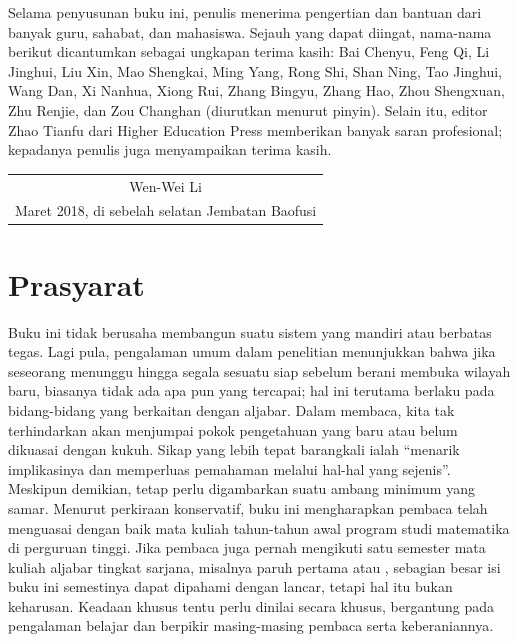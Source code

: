 Selama penyusunan buku ini, penulis menerima pengertian dan bantuan dari banyak guru, sahabat, dan mahasiswa. Sejauh yang dapat diingat, nama-nama berikut dicantumkan sebagai ungkapan terima kasih: Bai Chenyu, Feng Qi, Li Jinghui, Liu Xin, Mao Shengkai, Ming Yang, Rong Shi, Shan Ning, Tao Jinghui, Wang Dan, Xi Nanhua, Xiong Rui, Zhang Bingyu, Zhang Hao, Zhou Shengxuan, Zhu Renjie, dan Zou Changhan {\small(diurutkan menurut pinyin)}. Selain itu, editor Zhao Tianfu dari Higher Education Press memberikan banyak saran profesional; kepadanya penulis juga menyampaikan terima kasih.\nopagebreak

\vspace{1em}
\begin{flushright}\begin{minipage}{0.58\textwidth}
	\begin{tabular}{c}
		{\kaishu Wen-Wei Li} \\
		Maret 2018, di sebelah selatan Jembatan Baofusi
	\end{tabular}
\end{minipage}\end{flushright}
\vspace{1em}

\section*{Prasyarat}
Buku ini tidak berusaha membangun suatu sistem yang mandiri atau berbatas tegas. Lagi pula, pengalaman umum dalam penelitian menunjukkan bahwa jika seseorang menunggu hingga segala sesuatu siap sebelum berani membuka wilayah baru, biasanya tidak ada apa pun yang tercapai; hal ini terutama berlaku pada bidang-bidang yang berkaitan dengan aljabar. Dalam membaca, kita tak terhindarkan akan menjumpai pokok pengetahuan yang baru atau belum dikuasai dengan kukuh. Sikap yang lebih tepat barangkali ialah ``menarik implikasinya dan memperluas pemahaman melalui hal-hal yang sejenis''. Meskipun demikian, tetap perlu digambarkan suatu ambang minimum yang samar. Menurut perkiraan konservatif, buku ini mengharapkan pembaca telah menguasai dengan baik mata kuliah tahun-tahun awal program studi matematika di perguruan tinggi. Jika pembaca juga pernah mengikuti satu semester mata kuliah aljabar tingkat sarjana, misalnya paruh pertama \cite{DN00} atau \cite{ZHR}, sebagian besar isi buku ini semestinya dapat dipahami dengan lancar, tetapi hal itu bukan keharusan. Keadaan khusus tentu perlu dinilai secara khusus, bergantung pada pengalaman belajar dan berpikir masing-masing pembaca serta keberaniannya.

